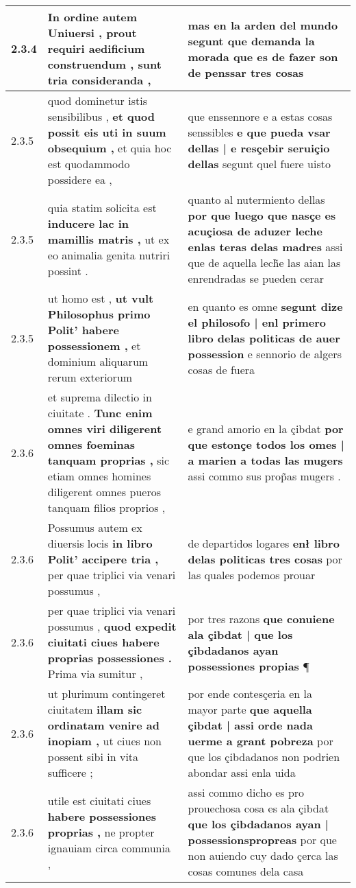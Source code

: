 \begin{tabular}{|p{1cm}|p{6.5cm}|p{6.5cm}|}
2.3.4 & In ordine autem Uniuersi , \textbf{ prout requiri aedificium construendum , } sunt tria consideranda , & mas en la arden del mundo \textbf{ segunt que demanda la morada } que es de fazer son de penssar tres cosas \\\hline
2.3.5 & quod dominetur istis sensibilibus , \textbf{ et quod possit eis uti in suum obsequium , } et quia hoc est quodammodo possidere ea , & que enssennore e a estas cosas senssibles \textbf{ e que pueda vsar dellas | e resçebir seruiçio dellas } segunt quel fuere uisto \\\hline
2.3.5 & quia statim solicita est \textbf{ inducere lac in mamillis matris , } ut ex eo animalia genita nutriri possint . & quanto al nutermiento dellas \textbf{ por que luego que nasçe es acuçiosa de aduzer leche enlas teras delas madres } assi que de aquella lech̃e las aian las enrendradas se pueden cerar \\\hline
2.3.5 & ut homo est , \textbf{ ut vult Philosophus primo Polit’ habere possessionem , } et dominium aliquarum rerum exteriorum & en quanto es omne \textbf{ segunt dize el philosofo | enl primero libro delas politicas de auer possession } e sennorio de algers cosas de fuera \\\hline
2.3.6 & et suprema dilectio in ciuitate . \textbf{ Tunc enim omnes viri diligerent omnes foeminas tanquam proprias , } sic etiam omnes homines diligerent omnes pueros tanquam filios proprios , & e grand amorio en la çibdat \textbf{ por que estonçe todos los omes | a marien a todas las mugers } assi commo sus prop̃as mugers . \\\hline
2.3.6 & Possumus autem ex diuersis locis \textbf{ in libro Polit’ accipere tria , } per quae triplici via venari possumus , & de departidos logares \textbf{ enł libro delas politicas tres cosas } por las quales podemos prouar \\\hline
2.3.6 & per quae triplici via venari possumus , \textbf{ quod expedit ciuitati ciues habere proprias possessiones . } Prima via sumitur , & por tres razons \textbf{ que conuiene ala çibdat | que los çibdadanos ayan possessiones propias } ¶ \\\hline
2.3.6 & ut plurimum contingeret ciuitatem \textbf{ illam sic ordinatam venire ad inopiam , } ut ciues non possent sibi in vita sufficere ; & por ende contesçeria en la mayor parte \textbf{ que aquella çibdat | assi orde nada uerme a grant pobreza } por que los çibdadanos non podrien abondar assi enla uida \\\hline
2.3.6 & utile est ciuitati ciues \textbf{ habere possessiones proprias , } ne propter ignauiam circa communia , & assi commo dicho es pro prouechosa cosa es ala çibdat \textbf{ que los çibdadanos ayan | possessionspropreas } por que non auiendo cuy dado çerca las cosas comunes dela casa \\\hline

\end{tabular}
